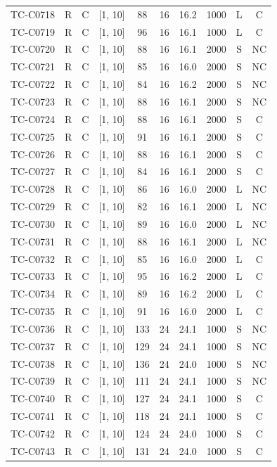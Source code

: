 \begin{longtable}{lccccccccc}
TC-C0718 & R & C & [1, 10] & 88 & 16 & 16.2 & 1000 & L & C \\
TC-C0719 & R & C & [1, 10] & 96 & 16 & 16.1 & 1000 & L & C \\
TC-C0720 & R & C & [1, 10] & 88 & 16 & 16.1 & 2000 & S & NC \\
TC-C0721 & R & C & [1, 10] & 85 & 16 & 16.0 & 2000 & S & NC \\
TC-C0722 & R & C & [1, 10] & 84 & 16 & 16.2 & 2000 & S & NC \\
TC-C0723 & R & C & [1, 10] & 88 & 16 & 16.1 & 2000 & S & NC \\
TC-C0724 & R & C & [1, 10] & 88 & 16 & 16.1 & 2000 & S & C \\
TC-C0725 & R & C & [1, 10] & 91 & 16 & 16.1 & 2000 & S & C \\
TC-C0726 & R & C & [1, 10] & 88 & 16 & 16.1 & 2000 & S & C \\
TC-C0727 & R & C & [1, 10] & 84 & 16 & 16.1 & 2000 & S & C \\
TC-C0728 & R & C & [1, 10] & 86 & 16 & 16.0 & 2000 & L & NC \\
TC-C0729 & R & C & [1, 10] & 82 & 16 & 16.1 & 2000 & L & NC \\
TC-C0730 & R & C & [1, 10] & 89 & 16 & 16.0 & 2000 & L & NC \\
TC-C0731 & R & C & [1, 10] & 88 & 16 & 16.1 & 2000 & L & NC \\
TC-C0732 & R & C & [1, 10] & 85 & 16 & 16.0 & 2000 & L & C \\
TC-C0733 & R & C & [1, 10] & 95 & 16 & 16.2 & 2000 & L & C \\
TC-C0734 & R & C & [1, 10] & 89 & 16 & 16.2 & 2000 & L & C \\
TC-C0735 & R & C & [1, 10] & 91 & 16 & 16.0 & 2000 & L & C \\
TC-C0736 & R & C & [1, 10] & 133 & 24 & 24.1 & 1000 & S & NC \\
TC-C0737 & R & C & [1, 10] & 129 & 24 & 24.1 & 1000 & S & NC \\
TC-C0738 & R & C & [1, 10] & 136 & 24 & 24.0 & 1000 & S & NC \\
TC-C0739 & R & C & [1, 10] & 111 & 24 & 24.1 & 1000 & S & NC \\
TC-C0740 & R & C & [1, 10] & 127 & 24 & 24.1 & 1000 & S & C \\
TC-C0741 & R & C & [1, 10] & 118 & 24 & 24.1 & 1000 & S & C \\
TC-C0742 & R & C & [1, 10] & 124 & 24 & 24.0 & 1000 & S & C \\
TC-C0743 & R & C & [1, 10] & 131 & 24 & 24.0 & 1000 & S & C \\

\end{longtable}
